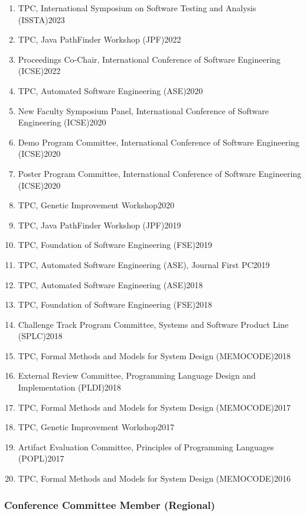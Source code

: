 \documentclass[10pt]{article}
\begin{document}
\begin{enumerate}
\item TPC,  International Symposium on Software Testing and Analysis (ISSTA)\hfill 2023  
\item TPC, Java PathFinder Workshop (JPF)\hfill 2022
\item Proceedings Co-Chair,  International Conference of Software Engineering (ICSE)\hfill 2022
\item TPC, Automated Software Engineering (ASE)\hfill 2020
\item New Faculty Symposium Panel, International Conference of Software Engineering (ICSE)\hfill 2020
\item Demo Program Committee, International Conference of Software Engineering (ICSE)\hfill 2020
\item Poster Program Committee, International Conference of Software Engineering (ICSE)\hfill 2020
\item TPC, Genetic Improvement Workshop\hfill 2020
\item TPC, Java PathFinder Workshop (JPF)\hfill 2019
\item TPC, Foundation of Software Engineering (FSE)\hfill 2019
\item TPC, Automated Software Engineering (ASE), Journal First PC\hfill 2019
\item TPC, Automated Software Engineering (ASE)\hfill 2018
\item TPC, Foundation of Software Engineering (FSE)\hfill 2018
\item Challenge Track Program Committee, Systems and Software Product Line (SPLC)\hfill 2018
\item TPC, Formal Methods and Models for System Design (MEMOCODE)\hfill 2018
\item External Review Committee, Programming Language Design and Implementation (PLDI)\hfill 2018
\item TPC, Formal Methods and Models for System Design (MEMOCODE)\hfill 2017
\item TPC, Genetic Improvement Workshop\hfill 2017
\item Artifact Evaluation Committee, Principles of Programming Languages (POPL)\hfill 2017
\item TPC, Formal Methods and Models for System Design (MEMOCODE)\hfill 2016
\end{enumerate}

\subsubsection{Conference Committee Member (Regional)}
\end{document}
